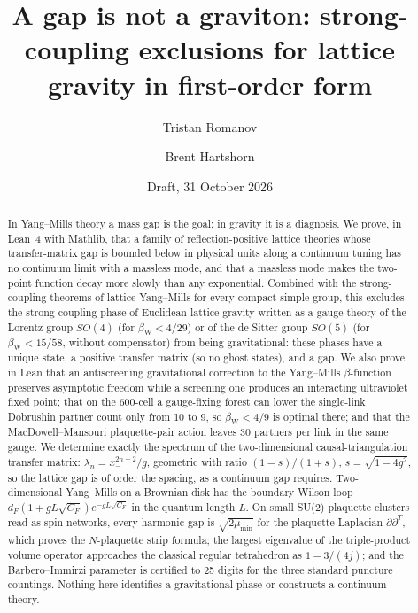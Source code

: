\documentclass[aps,prd,twocolumn,superscriptaddress,nofootinbib]{revtex4-2}
\theoremstyle{remark}
\newcommand{\bW}{\beta_{\mathrm W}}
\begin{document}
\title{A gap is not a graviton: strong-coupling exclusions for lattice gravity in first-order form}

\author{Tristan Romanov}

\author{Brent Hartshorn}

\date{Draft, 31 October 2026}

\begin{abstract}
In Yang--Mills theory a mass gap is the goal; in gravity it is a diagnosis. We prove, in Lean~4 with Mathlib,
that a family of reflection-positive lattice theories whose transfer-matrix gap is bounded below in physical units
along a continuum tuning has no continuum limit with a massless mode, and that a massless mode makes the two-point
function decay more slowly than any exponential. Combined with the strong-coupling theorems of lattice Yang--Mills
for every compact simple group, this excludes the strong-coupling phase of Euclidean lattice gravity written as a
gauge theory of the Lorentz group $SO(4)$ (for $\bW<4/29$) or of the de Sitter group $SO(5)$ (for $\bW<15/58$, without
compensator) from being gravitational: these phases have a unique state, a positive transfer matrix (so no ghost
states), and a gap. We also prove in Lean that an antiscreening gravitational correction to the Yang--Mills
$\beta$-function preserves asymptotic freedom while a screening one produces an interacting ultraviolet fixed point;
that on the 600-cell a gauge-fixing forest can lower the single-link Dobrushin partner count only from 10 to 9, so
$\bW<4/9$ is optimal there; and that the MacDowell--Mansouri plaquette-pair action leaves 30 partners per link in
the same gauge. We determine exactly the spectrum of the two-dimensional causal-triangulation transfer matrix:
$\lambda_n=x_-^{2n+2}/g$, geometric with ratio $(1-s)/(1+s)$, $s=\sqrt{1-4g^2}$, so the lattice gap is of order the
spacing, as a continuum gap requires. Two-dimensional Yang--Mills on a Brownian disk has the boundary Wilson loop
$d_F(1+gL\sqrt{C_F})e^{-gL\sqrt{C_F}}$ in the quantum length $L$. On small SU(2) plaquette clusters read as spin
networks, every harmonic gap is $\sqrt{2\mu_{\min}}$ for the plaquette Laplacian $\partial\partial^{T}$, which proves
the $N$-plaquette strip formula; the largest eigenvalue of the triple-product volume operator approaches the
classical regular tetrahedron as $1-3/(4j)$; and the Barbero--Immirzi parameter is certified to 25 digits for the
three standard puncture countings. Nothing here identifies a gravitational phase or constructs a continuum theory.
\end{abstract}
\end{document}

